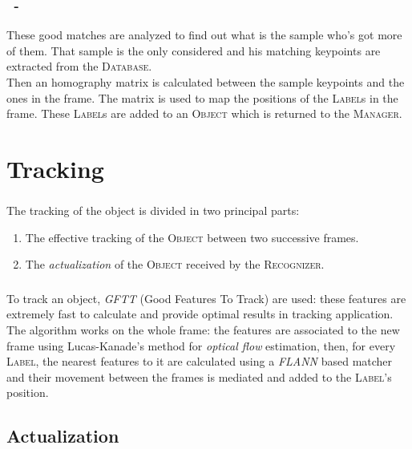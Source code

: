 \documentclass{beamer}
\begin{document}
	\begin{frame}
		\frametitle{\insertsection\ - \insertsubsection}
		These good matches are analyzed to find out what is the sample who's got
		more of them. That sample is the only considered and his matching keypoints
		are extracted from the \textsc{Database}.\\
		Then an homography matrix is calculated between the sample keypoints and the
		ones in the frame. The matrix is used to map the positions of the
		\textsc{Label}s in the frame. These \textsc{Label}s are added to an
		\textsc{Object} which is returned to the \textsc{Manager}.\\
	\end{frame}

	\section{Tracking}

	\begin{frame}
		\frametitle{\insertsection}
		The tracking of the object is divided in two principal parts:
		\begin{enumerate}
			\item The effective tracking of the \textsc{Object} between two
				successive frames.
			\item The \emph{actualization} of the \textsc{Object} received by the
				\textsc{Recognizer}.
		\end{enumerate}
	\end{frame}

	\begin{frame}
		\frametitle{\insertsection}
		To track an object, \emph{GFTT} (Good Features To Track) are used:
		these features are extremely fast to calculate and provide optimal results
		in tracking application.\\
		The algorithm works on the whole frame: the features are associated to the
		new frame using Lucas-Kanade's method for \emph{optical flow} estimation,
		then, for every \textsc{Label}, the nearest features to it are calculated
		using a \emph{FLANN} based matcher and their movement between the frames is
		mediated and added to the \textsc{Label}'s position.
	\end{frame}

	\subsection{Actualization}
\end{document}
